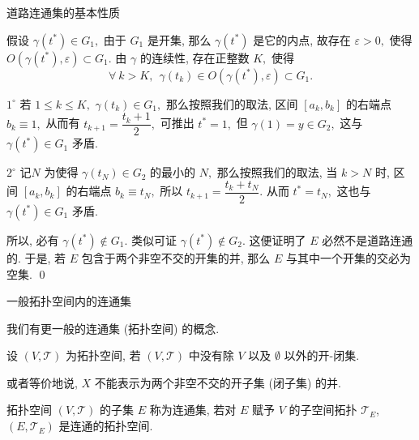 
\begin{frame}{道路连通集的基本性质}

假设 $\gamma(t^*) \in G_1,$ 由于 $G_1$ 是开集, 那么 $\gamma(t^*)$ 是它的内点, 故存在 $\varepsilon > 0,$ 使得 $O(\gamma(t^*), \varepsilon) \subset G_1.$ 由 $\gamma$ 的连续性, 存在正整数 $K,$ 使得
\[\forall~k > K, ~~ \gamma(t_k) \in O(\gamma(t^*), \varepsilon) \subset G_1.\]

\pause

$1^{\circ}$ 若 $1 \leqslant k \leqslant K,$ $\gamma(t_k) \in G_1,$ 那么按照我们的取法, 区间 $[a_k, b_k]$ 的右端点 $b_k \equiv 1,$ 从而有 $t_{k+1} = \dfrac{t_k + 1}{2},$ 可推出 $t^* = 1,$ 但 $\gamma(1) = y \in G_2,$ 这与 $\gamma(t^*) \in G_1$ 矛盾.

\vspace{0.5em}

$2^{\circ}$ 记$N$ 为使得 $\gamma(t_N) \in G_2$ 的最小的 $N,$ 那么按照我们的取法, 当 $k > N$ 时, 区间 $[a_k, b_k]$ 的右端点 $b_k \equiv t_N,$ 所以 $t_{k+1} = \dfrac{t_k + t_N}{2}.$ 从而 $t^* = t_N,$ 这也与 $\gamma(t^*) \in G_1$ 矛盾.

\vspace{0.5em}

所以, 必有 $\gamma(t^*) \not\in G_1.$ 类似可证 $\gamma(t^*) \not\in G_2.$ 这便证明了 $E$ 必然不是道路连通的. 于是, 若 $E$ 包含于两个非空不交的开集的并, 那么 $E$ 与其中一个开集的交必为空集.
\qed

\end{frame}


\graymode
\begin{frame}{一般拓扑空间内的连通集}

我们有更一般的连通集 (拓扑空间) 的概念.

\pause

\begin{Def}[连通的拓扑空间]
设 $(V, \mathscr{T})$ 为拓扑空间, 若 $(V, \mathscr{T})$ 中没有除 $V$ 以及 $\emptyset$ 以外的开-闭集.
\end{Def}

\pause

或者等价地说, $X$ 不能表示为两个非空不交的开子集 (闭子集) 的并.

\pause
\vspace{1em}

\begin{Def}[一般拓扑空间内的连通集]
拓扑空间 $(V, \mathscr{T})$ 的子集 $E$ 称为连通集, 若对 $E$ 赋予 $V$ 的子空间拓扑 $\mathscr{T}_E$, $(E, \mathscr{T}_E)$ 是连通的拓扑空间.
\end{Def}


\end{frame}

